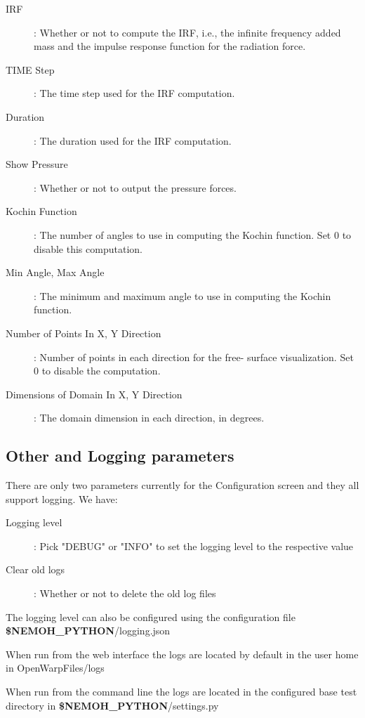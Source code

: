 \documentclass[12pt]{article}
\newcommand{\NEMOHPYTHON}{{\textbf{\$NEMOH{\_}PYTHON}}}
\begin{document}
\begin{description}
	\item [ IRF]: Whether or not to compute the IRF, i.e., the infinite frequency added mass and the impulse response function for the radiation force.
\item [TIME Step]: The time step used for the IRF computation.
\item [Duration]: The duration used for the IRF computation.
\item [Show Pressure]: Whether or not to output the pressure forces.
\item [Kochin Function]: The number of angles to use in computing the Kochin function. Set 0 to disable this computation.
\item [Min Angle, Max Angle]: The minimum and maximum angle to use in computing the Kochin function.
\item [Number of Points In X, Y Direction]: Number of points in each direction for the free- surface visualization. Set 0 to disable the computation.
\item [Dimensions of Domain In X, Y Direction]: The domain dimension in each direction, in degrees.
\end{description}


\subsection{Other and Logging parameters}

There are only two parameters currently for the Configuration screen and they all support logging. We have:

\begin{description}
	\item [Logging level]:  Pick "DEBUG" or "INFO" to set the logging level to the respective value
	
	\item [Clear old logs]: Whether or not to delete the old log files
\end{description}

The logging level can also be configured using the configuration file \NEMOHPYTHON{}/logging.json

When run from the web interface the logs are located by default in the user home in OpenWarpFiles/logs

When run from the command line the logs are located in the configured base test directory in 
\NEMOHPYTHON{}/settings.py
\end{document}
